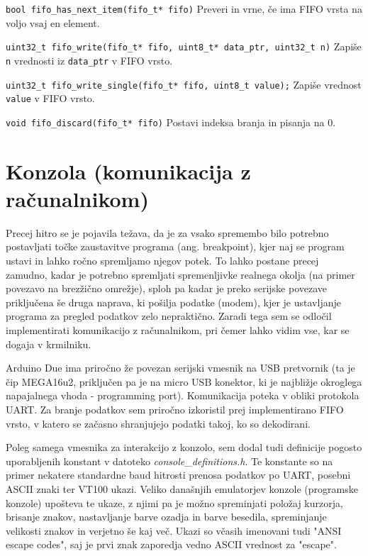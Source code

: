 \documentclass[12pt,a4paper,twoside,openright,slovene]{book}
\begin{document}
\lstinline{bool fifo_has_next_item(fifo_t* fifo)}\newline
Preveri in vrne, če ima FIFO vrsta na voljo vsaj en element.

\lstinline{uint32_t fifo_write(fifo_t* fifo, uint8_t* data_ptr, uint32_t n)}\newline
Zapiše \lstinline{n} vrednosti iz \lstinline{data_ptr} v FIFO vrsto.

\lstinline{uint32_t fifo_write_single(fifo_t* fifo, uint8_t value);}\newline
Zapiše vrednost \lstinline{value} v FIFO vrsto.

\lstinline{void fifo_discard(fifo_t* fifo)}\newline
Postavi indeksa branja in pisanja na 0.



\section{Konzola (komunikacija z računalnikom)}
Precej hitro se je pojavila težava, da je za vsako spremembo bilo potrebno postavljati točke zaustavitve programa (ang. breakpoint), kjer naj se program ustavi in lahko ročno spremljamo njegov potek. To lahko postane precej zamudno, kadar je potrebno spremljati spremenljivke realnega okolja (na primer povezavo na brezžično omrežje), sploh pa kadar je preko serijske povezave priključena še druga naprava, ki pošilja podatke (modem), kjer je ustavljanje programa za pregled podatkov zelo nepraktično. Zaradi tega sem se odločil implementirati komunikacijo z računalnikom, pri čemer lahko vidim vse, kar se dogaja v krmilniku.

Arduino Due ima priročno že povezan serijski vmesnik na USB pretvornik (ta je čip MEGA16u2, priključen pa je na micro USB konektor, ki je najbližje okroglega napajalnega vhoda - programming port). Komunikacija poteka v obliki protokola UART. Za branje podatkov sem priročno izkoristil prej implementirano FIFO vrsto, v katero se začasno shranjujejo podatki takoj, ko so dekodirani.

Poleg samega vmesnika za interakcijo z konzolo, sem dodal tudi definicije pogosto uporabljenih konstant v datoteko \textit{console\_definitions.h}. Te konstante so na primer nekatere standardne baud hitrosti prenosa podatkov po UART, posebni ASCII znaki ter VT100 ukazi. Veliko današnjih emulatorjev konzole (programske konzole) upošteva te ukaze, z njimi pa je možno spreminjati položaj kurzorja, brisanje znakov, nastavljanje barve ozadja in barve besedila, spreminjanje velikosti znakov in verjetno še kaj več. Ukazi so včasih imenovani tudi "ANSI escape codes", saj je prvi znak zaporedja vedno ASCII vrednost za "escape".
\end{document}
